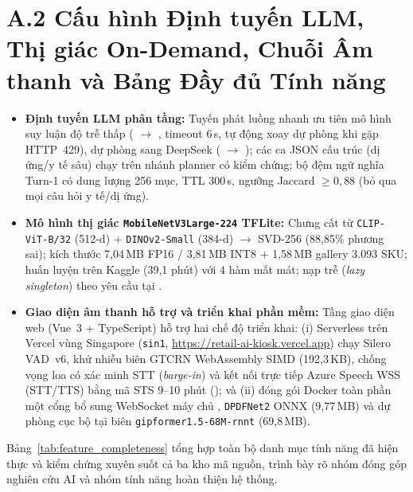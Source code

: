 \section*{A.2 Cấu hình Định tuyến LLM, Thị giác On-Demand, Chuỗi Âm thanh và Bảng Đầy đủ Tính năng}
\begin{itemize}
    \item \textbf{Định tuyến LLM phân tầng:} Tuyến phát luồng nhanh ưu tiên mô hình suy luận độ trễ thấp ( $\to$ , timeout 6\,s, tự động xoay dự phòng khi gặp HTTP~429), dự phòng sang DeepSeek ( $\to$ ); các ca JSON cấu trúc (dị ứng/y tế sâu) chạy trên nhánh planner có kiểm chứng; bộ đệm ngữ nghĩa Turn-1 có dung lượng 256 mục, TTL 300\,s, ngưỡng Jaccard $\ge 0{,}88$ (bỏ qua mọi câu hỏi y tế/dị ứng).
    \item \textbf{Mô hình thị giác \texttt{MobileNetV3Large-224} TFLite:} Chưng cất từ \texttt{CLIP-ViT-B/32} (512-d) + \texttt{DINOv2-Small} (384-d) $\to$ SVD-256 (88,85\% phương sai); kích thước 7,04\,MB FP16 / 3,81\,MB INT8 + 1,58\,MB gallery 3.093 SKU; huấn luyện trên Kaggle (39,1 phút) với 4 hàm mất mát; nạp trễ (\emph{lazy singleton}) theo yêu cầu tại .
    \item \textbf{Giao diện âm thanh hỗ trợ và triển khai phần mềm:} Tầng giao diện web (Vue~3 + TypeScript) hỗ trợ hai chế độ triển khai: (i) Serverless trên Vercel vùng Singapore (\texttt{sin1}, \url{https://retail-ai-kiosk.vercel.app}) chạy Silero VAD~v6, khử nhiễu biên GTCRN WebAssembly SIMD (192,3\,KB), chống vọng loa có xác minh STT (\emph{barge-in}) và kết nối trực tiếp Azure Speech WSS (STT/TTS) bằng mã STS 9--10 phút (); và (ii) đóng gói Docker toàn phần một cổng bổ sung WebSocket máy chủ , \texttt{DPDFNet2} ONNX (9,77\,MB) và dự phòng cục bộ tại biên \texttt{gipformer1.5-68M-rnnt} (69,8\,MB).
\end{itemize}

Bảng~\ref{tab:feature_completeness} tổng hợp toàn bộ danh mục tính năng đã hiện thực và kiểm chứng xuyên suốt cả ba kho mã nguồn, trình bày rõ nhóm đóng góp nghiên cứu AI và nhóm tính năng hoàn thiện hệ thống.

